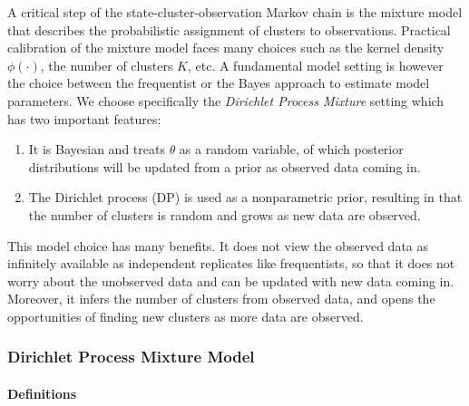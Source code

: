 A critical step of the state-cluster-observation Markov chain is the mixture model that describes the probabilistic assignment of clusters to observations. Practical calibration of the mixture model faces many choices such as the kernel density $\phi(\cdot)$, the number of clusters $K$, etc. A fundamental model setting is however the choice between the frequentist or the Bayes approach to estimate model parameters. We choose specifically the \textit{Dirichlet Process Mixture} setting which has two important features:
\begin{enumerate}
\item It is Bayesian and treats $\theta$ as a random variable, of which posterior distributions will be updated from a prior as observed data coming in. 
\item The Dirichlet process (DP) is used as a nonparametric prior, resulting in that the number of clusters is random and grows as new data are observed.
\end{enumerate}
This model choice has many benefits. It does not view the observed data as infinitely available as independent replicates like frequentists, so that it does not worry about the unobserved data and can be updated with new data coming in. Moreover, it infers the number of clusters from observed data, and opens the opportunities of finding new clusters as more data are observed.

\subsubsection{Dirichlet Process Mixture Model}

\paragraph*{Definitions}

